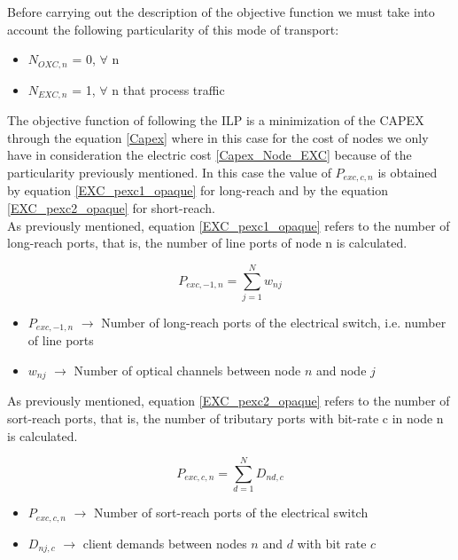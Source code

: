 Before carrying out the description of the objective function we must take into account the following particularity of this mode of transport:
\begin{itemize}
  \item $N_{OXC,n}$ = 0, \quad $\forall$ n
  \item $N_{EXC,n}$ = 1, \quad $\forall$ n that process traffic
\end{itemize}

\vspace{11pt}
The objective function of following the ILP is a minimization of the CAPEX through the equation \ref{Capex} where in this case for the cost of nodes we only have in consideration the electric cost \ref{Capex_Node_EXC} because of the particularity previously mentioned.
In this case the value of $P_{exc,c,n}$ is obtained by equation \ref{EXC_pexc1_opaque} for long-reach and by the equation \ref{EXC_pexc2_opaque} for short-reach.\\

\newpage
As previously mentioned, equation \ref{EXC_pexc1_opaque} refers to the number of long-reach ports, that is, the number of line ports of node n is calculated.

\begin{equation}
P_{exc,-1,n} = \sum_{j=1}^{N} w_{nj}
\label{EXC_pexc1_opaque}
\end{equation}

\begin{itemize}
\item{$P_{exc,-1,n}$	$\rightarrow$	Number of long-reach ports of the electrical switch, i.e. number of line ports}
\item{$w_{nj}$			$\rightarrow$	Number of optical channels between node $n$ and node $j$}
\end{itemize}

\vspace{11pt}
As previously mentioned, equation \ref{EXC_pexc2_opaque} refers to the number of sort-reach ports, that is, the number of tributary ports with bit-rate c in node n is calculated.

\begin{equation}
P_{exc,c,n} = \sum_{d=1}^{N} D_{nd,c}
\label{EXC_pexc2_opaque}
\end{equation}

\begin{itemize}
\item{$P_{exc,c,n}$	$\rightarrow$	Number of sort-reach ports of the electrical switch}
\item{$D_{nj,c}$	$\rightarrow$	client demands between nodes $n$ and $d$ with bit rate $c$}
\end{itemize}

